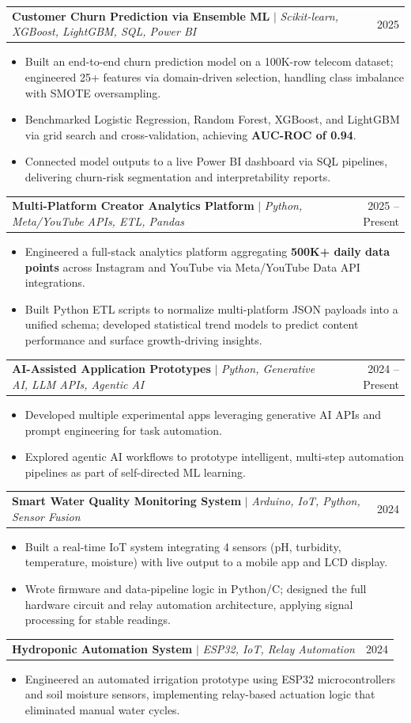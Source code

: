 \documentclass[letterpaper,10.5pt]{article}
\makeatletter
\newcommand{\resumeItem}[1]{
  \item\small{#1 \vspace{-2pt}}
}
\newcommand{\resumeProjectHeading}[2]{
    \item
    \begin{tabular*}{0.97\textwidth}{l@{\extracolsep{\fill}}r}
      \small#1 & \small #2 \\
    \end{tabular*}\vspace{-5pt}
}
\newcommand{\resumeItemListStart}{\begin{itemize}[leftmargin=0.18in]}
\newcommand{\resumeItemListEnd}{\end{itemize}\vspace{-4pt}}
\makeatother
\begin{document}
  \resumeProjectHeading
    {\textbf{Customer Churn Prediction via Ensemble ML} $|$ \textit{Scikit-learn, XGBoost, LightGBM, SQL, Power BI}}{2025}
    \resumeItemListStart
      \resumeItem{Built an end-to-end churn prediction model on a 100K-row telecom dataset; engineered 25+ features via domain-driven selection, handling class imbalance with SMOTE oversampling.}
      \resumeItem{Benchmarked Logistic Regression, Random Forest, XGBoost, and LightGBM via grid search and cross-validation, achieving \textbf{AUC-ROC of 0.94}.}
      \resumeItem{Connected model outputs to a live Power BI dashboard via SQL pipelines, delivering churn-risk segmentation and interpretability reports.}
    \resumeItemListEnd

  \resumeProjectHeading
    {\textbf{Multi-Platform Creator Analytics Platform} $|$ \textit{Python, Meta/YouTube APIs, ETL, Pandas}}{2025 -- Present}
    \resumeItemListStart
      \resumeItem{Engineered a full-stack analytics platform aggregating \textbf{500K+ daily data points} across Instagram and YouTube via Meta/YouTube Data API integrations.}
      \resumeItem{Built Python ETL scripts to normalize multi-platform JSON payloads into a unified schema; developed statistical trend models to predict content performance and surface growth-driving insights.}
    \resumeItemListEnd

  \resumeProjectHeading
    {\textbf{AI-Assisted Application Prototypes} $|$ \textit{Python, Generative AI, LLM APIs, Agentic AI}}{2024 -- Present}
    \resumeItemListStart
      \resumeItem{Developed multiple experimental apps leveraging generative AI APIs and prompt engineering for task automation.}
      \resumeItem{Explored agentic AI workflows to prototype intelligent, multi-step automation pipelines as part of self-directed ML learning.}
    \resumeItemListEnd

  \resumeProjectHeading
    {\textbf{Smart Water Quality Monitoring System} $|$ \textit{Arduino, IoT, Python, Sensor Fusion}}{2024}
    \resumeItemListStart
      \resumeItem{Built a real-time IoT system integrating 4 sensors (pH, turbidity, temperature, moisture) with live output to a mobile app and LCD display.}
      \resumeItem{Wrote firmware and data-pipeline logic in Python/C; designed the full hardware circuit and relay automation architecture, applying signal processing for stable readings.}
    \resumeItemListEnd

  \resumeProjectHeading
    {\textbf{Hydroponic Automation System} $|$ \textit{ESP32, IoT, Relay Automation}}{2024}
    \resumeItemListStart
      \resumeItem{Engineered an automated irrigation prototype using ESP32 microcontrollers and soil moisture sensors, implementing relay-based actuation logic that eliminated manual water cycles.}
    \resumeItemListEnd
\end{document}

